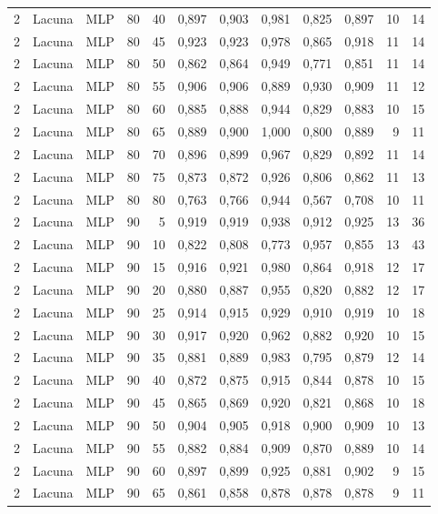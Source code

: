 \begin{longtable}{@{}rllrrrrrrrrr@{}}
2 & Lacuna & MLP & 80 & 40 & 0,897 & 0,903 & 0,981 & 0,825 & 0,897 & 10 & 14 \\
2 & Lacuna & MLP & 80 & 45 & 0,923 & 0,923 & 0,978 & 0,865 & 0,918 & 11 & 14 \\
2 & Lacuna & MLP & 80 & 50 & 0,862 & 0,864 & 0,949 & 0,771 & 0,851 & 11 & 14 \\
2 & Lacuna & MLP & 80 & 55 & 0,906 & 0,906 & 0,889 & 0,930 & 0,909 & 11 & 12 \\
2 & Lacuna & MLP & 80 & 60 & 0,885 & 0,888 & 0,944 & 0,829 & 0,883 & 10 & 15 \\
2 & Lacuna & MLP & 80 & 65 & 0,889 & 0,900 & 1,000 & 0,800 & 0,889 & 9 & 11 \\
2 & Lacuna & MLP & 80 & 70 & 0,896 & 0,899 & 0,967 & 0,829 & 0,892 & 11 & 14 \\
2 & Lacuna & MLP & 80 & 75 & 0,873 & 0,872 & 0,926 & 0,806 & 0,862 & 11 & 13 \\
2 & Lacuna & MLP & 80 & 80 & 0,763 & 0,766 & 0,944 & 0,567 & 0,708 & 10 & 11 \\
2 & Lacuna & MLP & 90 & 5 & 0,919 & 0,919 & 0,938 & 0,912 & 0,925 & 13 & 36 \\
2 & Lacuna & MLP & 90 & 10 & 0,822 & 0,808 & 0,773 & 0,957 & 0,855 & 13 & 43 \\
2 & Lacuna & MLP & 90 & 15 & 0,916 & 0,921 & 0,980 & 0,864 & 0,918 & 12 & 17 \\
2 & Lacuna & MLP & 90 & 20 & 0,880 & 0,887 & 0,955 & 0,820 & 0,882 & 12 & 17 \\
2 & Lacuna & MLP & 90 & 25 & 0,914 & 0,915 & 0,929 & 0,910 & 0,919 & 10 & 18 \\
2 & Lacuna & MLP & 90 & 30 & 0,917 & 0,920 & 0,962 & 0,882 & 0,920 & 10 & 15 \\
2 & Lacuna & MLP & 90 & 35 & 0,881 & 0,889 & 0,983 & 0,795 & 0,879 & 12 & 14 \\
2 & Lacuna & MLP & 90 & 40 & 0,872 & 0,875 & 0,915 & 0,844 & 0,878 & 10 & 15 \\
2 & Lacuna & MLP & 90 & 45 & 0,865 & 0,869 & 0,920 & 0,821 & 0,868 & 10 & 18 \\
2 & Lacuna & MLP & 90 & 50 & 0,904 & 0,905 & 0,918 & 0,900 & 0,909 & 10 & 13 \\
2 & Lacuna & MLP & 90 & 55 & 0,882 & 0,884 & 0,909 & 0,870 & 0,889 & 10 & 14 \\
2 & Lacuna & MLP & 90 & 60 & 0,897 & 0,899 & 0,925 & 0,881 & 0,902 & 9 & 15 \\
2 & Lacuna & MLP & 90 & 65 & 0,861 & 0,858 & 0,878 & 0,878 & 0,878 & 9 & 11 \\

\end{longtable}
